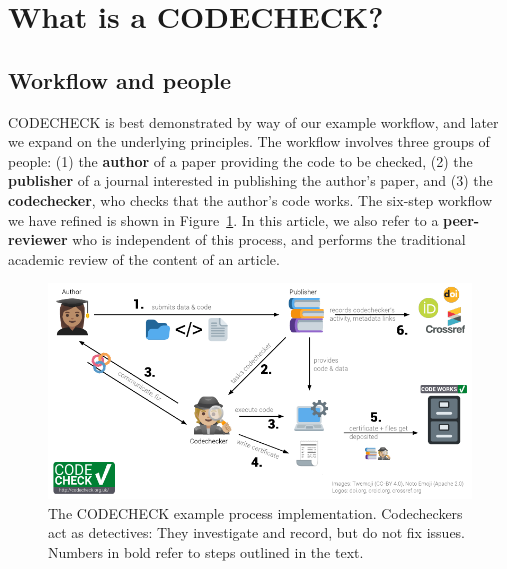 \documentclass[12pt]{article}
\begin{document}
\section*{What is a CODECHECK?}\label{what-is-a-codecheck}

\subsection*{Workflow and people}\label{workflow-people}

CODECHECK is best demonstrated by way of our example workflow, and later
we expand on the underlying principles. The workflow involves three
groups of people:
(1) the \textbf{author} of a paper providing the code to be checked,
(2) the \textbf{publisher} of a journal interested in publishing the author's paper, and
(3) the \textbf{codechecker}, who checks that the author's code works.
The six-step workflow we have refined is shown in
Figure~\ref{fig:workflow}.  In this article, we also refer to a
\textbf{peer-reviewer} who is independent of this process, and
performs the traditional academic review of the content of an article.

\begin{figure}
  \centering
      \includegraphics[width=\textwidth]{figs/codecheck_overview.pdf}
      \caption{The CODECHECK example process implementation.
        Codecheckers act as detectives: They investigate and record,
        but do not fix issues.  Numbers in bold refer to steps
        outlined in the text.}
  \label{fig:workflow}
\end{figure}
\end{document}
